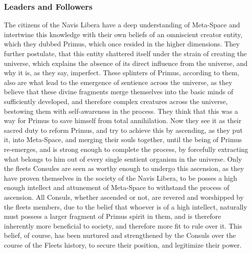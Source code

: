 \documentclass[a4paper,12pt]{report}
\begin{document}
\subsubsection*{Leaders and Followers}
The  citizens of the Navis Libera have a deep understanding of Meta-Space and intertwine this knowledge with their own beliefs of an omniscient creator entity, which they dubbed Primus, which once resided in the higher dimensions. They further postulate, that this entity shattered itself under the strain of creating the universe, which explains the absence of its direct influence from the universe, and why it is, as they say, imperfect. These splinters of Primus, according to them, also are what lead to the emergence of sentience across the universe, as they believe that these divine fragments merge themselves into the basic minds of sufficiently developed, and therefore complex creatures across the universe, bestowing them with self-awareness in the process. They think that this was a way for Primus to save himself from total annihilation. Now they see it as their sacred duty to reform Primus, and try to achieve this by ascending, as they put it, into Meta-Space, and merging their souls together, until the being of Primus re-emerges, and is strong enough to complete the process, by forcefully extracting what belongs to him out of every single sentient organism in the universe. Only the fleets Consules are seen as worthy enough to undergo this ascension, as they have proven themselves in the society of the Navis Libera, to be posses a high enough intellect and attunement of Meta-Space to withstand the process of ascension. All Consuls, whether ascended or not, are revered and worshipped by the fleets members, due to the belief that whoever is of a high intellect, naturally must possess a larger fragment of Primus spirit in them, and is therefore inherently more beneficial to society, and therefore more fit to rule over it. This belief, of course, has been nurtured and strengthened by the Consuls over the course of the Fleets history, to secure their position, and legitimize their power.\\
\\
\end{document}
